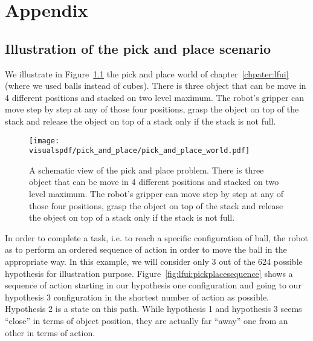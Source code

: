 
\chapter{Appendix}
\label{appendix}

\section{Illustration of the pick and place scenario}
\label{appendix:pickplace}

We illustrate in Figure~\ref{fig:lfui:pickplaceworld} the pick and place world of chapter~\ref{chpater:lfui} (where we used balls instead of cubes). There is three object that can be move in 4 different positions and stacked on two level maximum. The robot's gripper can move step by step at any of those four positions, grasp the object on top of the stack and release the object on top of a stack only if the stack is not full.

\begin{figure}[!ht]
  \centering
  \texttt{[image: \\visualspdf/pick\_and\_place/pick\_and\_place\_world.pdf]}
  \caption{A schematic view of the pick and place problem. There is three object that can be move in 4 different positions and stacked on two level maximum. The robot's gripper can move step by step at any of those four positions, grasp the object on top of the stack and release the object on top of a stack only if the stack is not full.}
  \label{fig:lfui:pickplaceworld}
\end{figure}

In order to complete a task, i.e. to reach a specific configuration of ball, the robot as to perform an ordered sequence of action in order to move the ball in the appropriate way. In this example, we will consider only 3 out of the 624 possible hypothesis for illustration purpose. Figure~\ref{fig:lfui:pickplacesequence} shows a sequence of action starting in our hypothesis one configuration and going to our hypothesis 3 configuration in the shortest number of action as possible. Hypothesis 2 is a state on this path. While hypothesis 1 and hypothesis 3 seems ``close'' in terms of object position, they are actually far ``away'' one from an other in terms of action.

